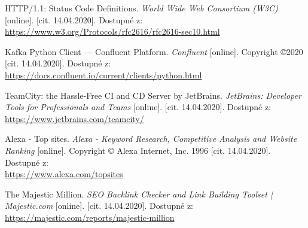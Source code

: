 \documentclass[thesis=M,czech,hidelinks]{FITthesis}[2013/05/06]
\begin{document}
\begin{thebibliography}{9}
	HTTP/1.1: Status Code Definitions. \textit{World Wide Web Consortium (W3C)} [online]. [cit. 14.04.2020]. Dostupné z: \\ 
	\url{https://www.w3.org/Protocols/rfc2616/rfc2616-sec10.html}
	
	Kafka Python Client — Confluent Platform. \textit{Confluent} [online]. Copyright ©2020 [cit. 14.04.2020]. Dostupné z:  \\ 
	\url{https://docs.confluent.io/current/clients/python.html}
	
	TeamCity: the Hassle-Free CI and CD Server by JetBrains. \textit{JetBrains: Developer Tools for Professionals and Teams} [online]. [cit. 14.04.2020]. Dostupné z: \\ 
	\url{https://www.jetbrains.com/teamcity/}
	
	Alexa - Top sites. \textit{Alexa - Keyword Research, Competitive Analysis and Website Ranking} [online]. Copyright © Alexa Internet, Inc. 1996 [cit. 14.04.2020]. Dostupné z:  \\ 
	\url{https://www.alexa.com/topsites}
	
	The Majestic Million. \textit{SEO Backlink Checker and Link Building Toolset | Majestic.com} [online]. [cit. 14.04.2020]. Dostupné z:  \\ 
	\url{https://majestic.com/reports/majestic-million}
	
\end{thebibliography}

\appendix



\end{document}
